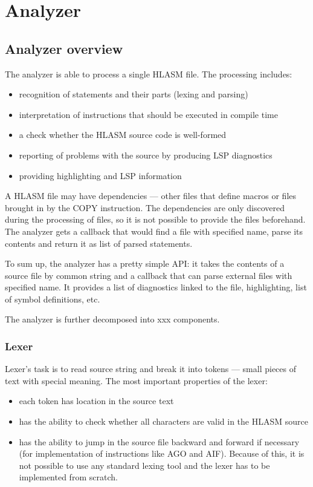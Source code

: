 \chapter {Analyzer}

\section{Analyzer overview}



The analyzer is able to process a single HLASM file. The processing includes:
\begin{itemize}
	\item recognition of statements and their parts (lexing and parsing)
	\item interpretation of instructions that should be executed in compile time
	\item a check whether the HLASM source code is well-formed
	\item reporting of problems with the source by producing LSP diagnostics
	\item providing highlighting and LSP information
\end{itemize}

A HLASM file may have dependencies --- other files that define macros or files brought in by the COPY instruction. The dependencies are only discovered during the processing of files, so it is not possible to provide the files beforehand. The analyzer gets a callback that would find a file with specified name, parse its contents and return it as list of parsed statements. 

To sum up, the analyzer has a pretty simple API: it takes the contents of a source file by common string and a callback that can parse external files with specified name. It provides a list of diagnostics linked to the file, highlighting, list of symbol definitions, etc.

The analyzer is further decomposed into xxx components.

\subsection{Lexer}

Lexer's task is to read source string and break it into tokens --- small pieces of text with special meaning. The most important properties of the lexer:
\begin{itemize}
	\item each token has location in the source text
	\item has the ability to check whether all characters are valid in the HLASM source
	\item has the ability to jump in the source file backward and forward if necessary (for implementation of instructions like AGO and AIF). Because of this, it is not possible to use any standard lexing tool and the lexer has to be implemented from scratch.
\end{itemize}

